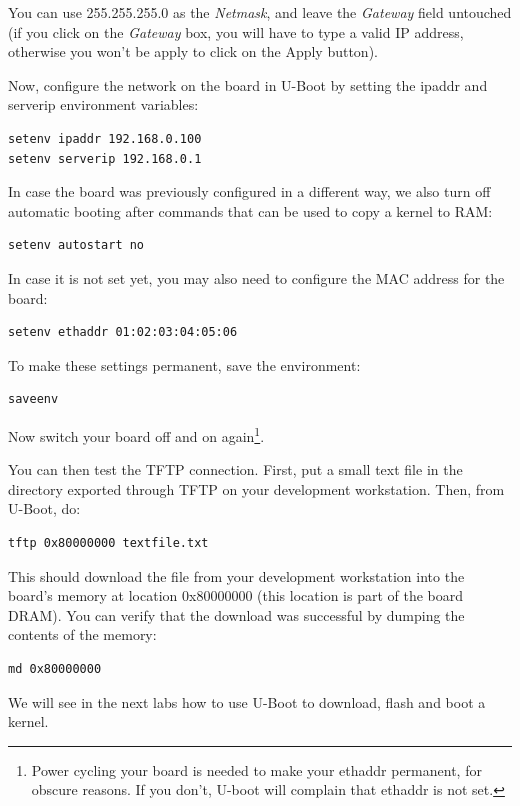 You can use 255.255.255.0 as the {\em Netmask}, and leave the {\em
  Gateway} field untouched (if you click on the {\em Gateway} box, you
will have to type a valid IP address, otherwise you won't be apply to
click on the Apply button).

Now, configure the network on the board in U-Boot by setting the ipaddr and serverip environment variables:

\begin{verbatim}
setenv ipaddr 192.168.0.100
setenv serverip 192.168.0.1
\end{verbatim}

In case the board was previously configured in a different way, we
also turn off automatic booting after commands that can be used to
copy a kernel to RAM:

\begin{verbatim}
setenv autostart no
\end{verbatim}

In case it is not set yet, you may also need to configure the MAC address for the board:

\begin{verbatim}
setenv ethaddr 01:02:03:04:05:06
\end{verbatim}

To make these settings permanent, save the environment:

\begin{verbatim}
saveenv
\end{verbatim}

Now switch your board off and on again\footnote{Power cycling your
  board is needed to make your ethaddr permanent, for obscure
  reasons. If you don't, U-boot will complain that ethaddr is not
  set.}.

You can then test the TFTP connection. First, put a small text file in
the directory exported through TFTP on your development
workstation. Then, from U-Boot, do:

\begin{verbatim}
tftp 0x80000000 textfile.txt
\end{verbatim}

This should download the file  from your development
workstation into the board's memory at location 0x80000000 (this
location is part of the board DRAM). You can verify that the download
was successful by dumping the contents of the memory:

\begin{verbatim}
md 0x80000000
\end{verbatim}

We will see in the next labs how to use U-Boot to download, flash and
boot a kernel.
